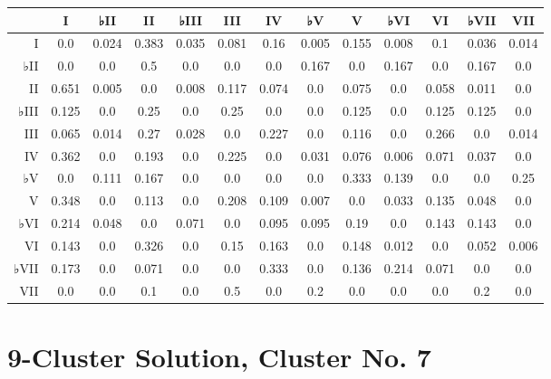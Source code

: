 \begin{table}[htbp]
\begin{minipage}{\linewidth}
\setlength{\tymax}{0.5\linewidth}
\centering
\small
\begin{tabulary}{\textwidth}{@{}RCCCCCCCCCCCC@{}} \toprule
&I&♭II&II&♭III&III&IV&♭V&V&♭VI&VI&♭VII&VII\\
\midrule
I&0.0&0.024&0.383&0.035&0.081&0.16&0.005&0.155&0.008&0.1&0.036&0.014\\
♭II&0.0&0.0&0.5&0.0&0.0&0.0&0.167&0.0&0.167&0.0&0.167&0.0\\
II&0.651&0.005&0.0&0.008&0.117&0.074&0.0&0.075&0.0&0.058&0.011&0.0\\
♭III&0.125&0.0&0.25&0.0&0.25&0.0&0.0&0.125&0.0&0.125&0.125&0.0\\
III&0.065&0.014&0.27&0.028&0.0&0.227&0.0&0.116&0.0&0.266&0.0&0.014\\
IV&0.362&0.0&0.193&0.0&0.225&0.0&0.031&0.076&0.006&0.071&0.037&0.0\\
♭V&0.0&0.111&0.167&0.0&0.0&0.0&0.0&0.333&0.139&0.0&0.0&0.25\\
V&0.348&0.0&0.113&0.0&0.208&0.109&0.007&0.0&0.033&0.135&0.048&0.0\\
♭VI&0.214&0.048&0.0&0.071&0.0&0.095&0.095&0.19&0.0&0.143&0.143&0.0\\
VI&0.143&0.0&0.326&0.0&0.15&0.163&0.0&0.148&0.012&0.0&0.052&0.006\\
♭VII&0.173&0.0&0.071&0.0&0.0&0.333&0.0&0.136&0.214&0.071&0.0&0.0\\
VII&0.0&0.0&0.1&0.0&0.5&0.0&0.2&0.0&0.0&0.0&0.2&0.0\\

\bottomrule

\end{tabulary}
\end{minipage}
\end{table}

\section{9-Cluster Solution, Cluster No. 7}
\label{9-clustersolutionclusterno.7}

